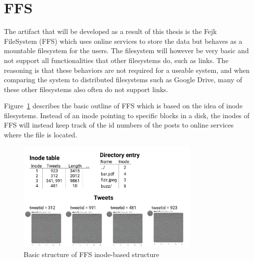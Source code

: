 \section{FFS}
The artifact that will be developed as a result of this thesis is the Fejk FileSystem (FFS) which uses online services to store the data but behaves as a mountable filesystem for the users. The filesystem will however be very basic and not support all functionalities that other filesystems do, such as links. The reasoning is that these behaviors are not required for a useable system, and when comparing the system to distributed filesystems such as Google Drive, many of these other filesystems also often do not support links.

Figure~\ref{fig:ffs_inode_diag} describes the basic outline of FFS which is based on the idea of inode filesystems. Instead of an inode pointing to specific blocks in a disk, the inodes of FFS will instead keep track of the id numbers of the posts to online services where the file is located. 

\begin{figure}[!ht]
	\begin{center}
	  \includegraphics[width=0.8\textwidth]{figures/ffs_inode_diagram.png}
	\end{center}
	\caption{Basic structure of FFS inode-based structure}
	\label{fig:ffs_inode_diag}
\end{figure}

